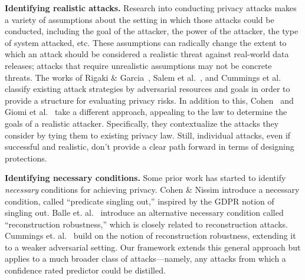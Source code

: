 
    
\medskip\noindent
\textbf{Identifying realistic attacks.} Research into conducting privacy attacks makes a variety of assumptions about the setting in which those attacks could be conducted, including  the goal of the attacker, the power of the attacker, the type of system attacked, etc. 
These assumptions can radically change the extent to which an attack should be considered a realistic threat against real-world data releases; attacks that require unrealistic assumptions may not be concrete threats. 
The works of Rigaki \& Garcia~\cite{RigakiG24}, Salem et al.~\cite{SalemCEKPSTB23}, and Cummings et al.~\cite{CummingsHSS24} classify existing attack strategies by adversarial resources and goals in order to provide a structure for evaluating privacy risks.
In addition to this, Cohen~\cite{Cohen22} and Giomi et al.~\cite{giomi2022unified} take a different approach, appealing to the law to determine the goals of a realistic attacker.  Specifically, they contextualize the attacks they consider by tying them to existing privacy law. Still, individual attacks, even if successful and realistic, don't provide a clear path forward in terms of designing protections.

\medskip\noindent
\textbf{Identifying necessary conditions.} Some prior work has started to identify \emph{necessary} conditions for achieving privacy.
Cohen \& Nissim \cite{CohenN20b} introduce a necessary condition, called ``predicate singling out,'' inspired by the GDPR notion of singling out.
Balle et. al.~\cite{BalleCH22} introduce an alternative necessary condition called ``reconstruction robustness,'' which is closely related to reconstruction attacks. Cummings et. al.~\cite{CummingsHSS24} build on the notion of reconstruction robustness, extending it to a weaker adversarial setting. 
Our framework extends this general approach but applies to a much broader class of attacks---namely, any attacks from which a confidence rated predictor could be distilled.

